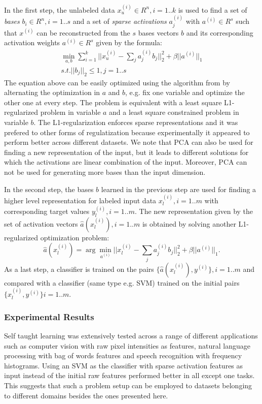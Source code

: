 \documentclass[10pt,journal,a4paper]{IEEEtran}
\begin{document}
In the first step, the unlabeled data $x^{(i)}_u \in R^n, i=1..k$ is used to find a set of \textit{bases} $b_i \in R^n, i=1..s$ and a set of \textit{sparse activations} $a_j^{(i)}$ with $a^{(i)}\in R^s$ such that $x^{(i)}$ can
be reconstructed from the $s$ bases vectors $b$ and its corresponding activation weights $a^{(i)} \in R^s$ given by the formula:
\begin{equation}
\begin{array}{c }
	\min_{a,b} \sum_{i=1}^k ||x_u^{(i)} - \sum_j a_j^{(i)} b_j||_2^2 + \beta||a^{(i)}||_1    \\
	 s.t. ||b_j||_2 \leq 1, j=1..s
	\end{array}
\end{equation}
The equation above can be easily optimized using the algorithm from \cite{sparsetraining} by alternating the optimization in $a$ and $b$, e.g. fix one variable and optimize the other one at every step.
The problem is equivalent with a least square L1-regularized problem in variable $a$ and a least square constrained problem in  variable $b$. The L1-regularization enforces sparse representations and it was prefered to other forms of regulatization because experimentally it appeared to perform better across different datasets. We note that PCA can also be used for finding a new representation of the input, but it leads to different solutions for which the activations are linear combination of the input. Moreover,  PCA can not be used for generating more bases than the input dimension.


In the second step, the bases $b$ learned in the previous step are used for finding a higher level representation for labeled input data $x_l^{(i)}, i=1..m$ with corresponding target values $y_l^{(i)}, i=1..m$. The new representation given by the set of activation vectors $\hat{a}(x_l^{(i)}), i=1..m$ is obtained by solving another L1- regularized optimization problem:
\begin{equation}
\hat{a}(x_l^{(i)}) = \arg\min_{a^{(i)}}|| x_l^{(i)} - \sum_j a_j^{(i)}b_j||_2^2 + \beta||a^{(i)}||_1.
\end{equation}
As a last step, a classifier is trained on the pairs $\{\hat{a}(x_l^{(i)}), y^{(i)}\} , i=1..m$ and compared with a classifier (same type e.g. SVM) trained on the initial pairs $\{x_l^{(i)}, y^{(i)}\} i=1..m$.


\subsubsection{Experimental Results}
Self taught learning was extensively tested across a range of different applications such as computer vision with raw pixel intensities as features, natural language processing with bag of words features and speech recognition with frequency histograms. Using an SVM as the classifier with sparse activation features as input instead of the initial raw features performed better in all except one tasks. This suggests that such a problem setup can be employed to datasets belonging to different domains besides the ones presented here.
\end{document}
